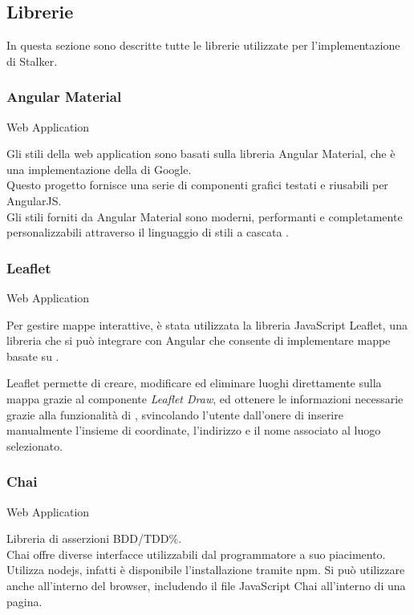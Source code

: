 \documentclass[../../../manuale-sviluppatore.tex]{subfiles}
\begin{document}
\subsection{Librerie}%
\label{sub:librerie}
In questa sezione sono descritte tutte le librerie utilizzate per l'implementazione di Stalker.

\subsubsection{Angular Material}%
\label{subs:angular_material}
Web Application

Gli stili della web application sono basati sulla libreria Angular Material, che è una implementazione della  di Google.\\
Questo progetto fornisce una serie di componenti grafici testati e riusabili per AngularJS\@.\\
Gli stili forniti da Angular Material sono moderni, performanti e completamente personalizzabili attraverso il linguaggio di stili a cascata .

\subsubsection{Leaflet}%
\label{subs:leaflet}
Web Application

Per gestire mappe interattive, è stata utilizzata la libreria JavaScript Leaflet, una libreria che si può integrare con Angular che consente di implementare mappe basate su .

Leaflet permette di creare, modificare ed eliminare luoghi direttamente sulla mappa grazie al componente \textit{Leaflet Draw}, ed ottenere le informazioni necessarie grazie alla funzionalità di , svincolando l'utente dall'onere di inserire manualmente l'insieme di coordinate, l'indirizzo e il nome associato al luogo selezionato.

\subsubsection{Chai}%
\label{subs:chai}
Web Application

Libreria di asserzioni BDD/TDD\%.\\
Chai offre diverse interfacce utilizzabili dal programmatore a suo piacimento.\\
Utilizza nodejs, infatti è disponibile l'installazione tramite npm. Si può utilizzare anche all'interno del browser, includendo il file JavaScript Chai all'interno di una pagina.
\end{document}
